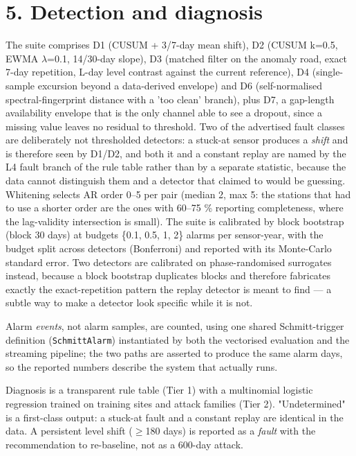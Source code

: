 \documentclass[10pt,a4paper]{article}
\begin{document}
\section*{5. Detection and diagnosis}
The suite comprises D1 (CUSUM + 3/\allowbreak{}7-\allowbreak{}day mean shift), D2 (CUSUM k=0.5, EWMA $\lambda$=0.1, 14/\allowbreak{}30-\allowbreak{}day slope), D3 (matched filter on the anomaly road, exact 7-\allowbreak{}day repetition, L-\allowbreak{}day level contrast against the current reference), D4 (single-\allowbreak{}sample excursion beyond a data-\allowbreak{}derived envelope) and D6 (self-\allowbreak{}normalised spectral-\allowbreak{}fingerprint distance with a 'too clean' branch), plus D7, a gap-\allowbreak{}length availability envelope that is the only channel able to see a dropout, since a missing value leaves no residual to threshold. Two of the advertised fault classes are deliberately not thresholded detectors: a stuck-\allowbreak{}at sensor produces a \emph{shift} and is therefore seen by D1/\allowbreak{}D2, and both it and a constant replay are named by the L4 fault branch of the rule table rather than by a separate statistic, because the data cannot distinguish them and a detector that claimed to would be guessing. Whitening selects AR order 0–5 per pair (median 2, max 5: the stations that had to use a shorter order are the ones with 60–75 \% reporting completeness, where the lag-\allowbreak{}validity intersection is small). The suite is calibrated by block bootstrap (block 30 days) at budgets \{0.1, 0.5, 1, 2\} alarms per sensor-\allowbreak{}year, with the budget split across detectors (Bonferroni) and reported with its Monte-\allowbreak{}Carlo standard error. Two detectors are calibrated on phase-\allowbreak{}randomised surrogates instead, because a block bootstrap duplicates blocks and therefore fabricates exactly the exact-\allowbreak{}repetition pattern the replay detector is meant to find — a subtle way to make a detector look specific while it is not.

Alarm \emph{events}, not alarm samples, are counted, using one shared Schmitt-\allowbreak{}trigger definition (\texttt{SchmittAlarm}) instantiated by both the vectorised evaluation and the streaming pipeline; the two paths are asserted to produce the same alarm days, so the reported numbers describe the system that actually runs.

Diagnosis is a transparent rule table (Tier 1) with a multinomial logistic regression trained on training sites and attack families (Tier 2). "Undetermined" is a first-\allowbreak{}class output: a stuck-\allowbreak{}at fault and a constant replay are identical in the data. A persistent level shift ($\geq$180 days) is reported as a \emph{fault} with the recommendation to re-\allowbreak{}baseline, not as a 600-\allowbreak{}day attack.
\end{document}
